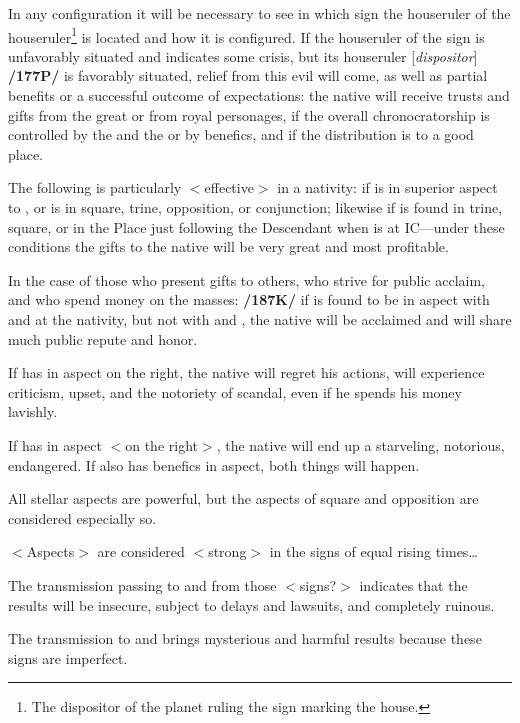 In any configuration it will be necessary to see in which sign the houseruler of the houseruler\footnote{The dispositor of the planet ruling the sign marking the house.} is located and how it is configured. If the houseruler of the sign is unfavorably situated and indicates some crisis, but its houseruler [\textit{dispositor}] \textbf{/177P/} is favorably situated, relief from this evil will come, as well as partial benefits or a successful outcome of expectations: the native will receive trusts and gifts from the great or from royal personages, if the overall chronocratorship is controlled by the \Sun\xspace and the \Moon\xspace or by benefics, and if the distribution is to a good place. 


The following is particularly $<$effective$>$ in a nativity: if \Jupiter\xspace is in superior aspect to \Saturn, or is in square, trine, opposition, or conjunction; likewise if \Mars\xspace is found in trine, square, or in the Place just following the Descendant when \Jupiter\xspace is at IC—under these conditions the gifts to the native will be very great and most profitable. 

In the case of those who present gifts to others, who strive for public acclaim, and who spend money on the masses: \textbf{/187K/} if \Mercury\xspace is found to be in aspect with \Jupiter\xspace and \Venus\xspace at the nativity, but not with \Saturn\xspace and \Mars, the native will be acclaimed and will share much public repute and honor. 

If \Mercury\xspace has \Mars\xspace in aspect on the right, the
native will regret his actions, will experience criticism, upset, and the notoriety of scandal, even if he spends his money lavishly. 

If \Mercury\xspace has \Saturn\xspace in aspect $<$on the right$>$, the native will end up a starveling, notorious, endangered. If \Mercury\xspace also has benefics in aspect, both things will happen.

All stellar aspects are powerful, but the aspects of square and opposition are considered especially so.

$<$Aspects$>$ are considered $<$strong$>$ in the signs of equal rising times\ldots

The transmission passing to \Taurus\xspace and \Virgo\xspace from those $<$signs?$>$ indicates that the results will be
insecure, subject to delays and lawsuits, and completely ruinous. 

The transmission to \Sagittarius\xspace and \Capricorn\xspace brings mysterious and harmful results because these signs are imperfect.

